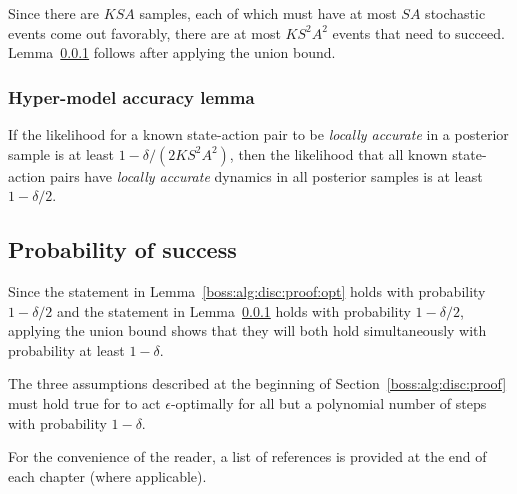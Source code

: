 Since there are $K S A$ samples, each of which must have at most $S A$ stochastic events come out favorably, there are at most $K S^2 A^2$ events that need to succeed. Lemma~\ref{boss:alg:disc:proof:acc} follows after applying the union bound.

\subsubsection{Hyper-model accuracy lemma}
\label{boss:alg:disc:proof:acc}
If the likelihood for a known state-action pair to be \emph{locally accurate} in a posterior sample is at least $1-\delta/(2 K S^2 A^2)$, then the likelihood that all known state-action pairs have \emph{locally accurate} dynamics in all posterior samples is at least $1-\delta/2$.


\subsection{Probability of success}

Since the statement in Lemma~\ref{boss:alg:disc:proof:opt} holds with probability $1-\delta/2$ and the statement in Lemma~\ref{boss:alg:disc:proof:acc} holds with probability $1-\delta/2$, applying the union bound shows that they will both hold simultaneously with probability at least $1-\delta$.

The three assumptions described at the beginning of Section~\ref{boss:alg:disc:proof} must hold true for  to act $\epsilon$-optimally for all but a polynomial number of steps with probability $1-\delta$. 



%
\ifperchapterbib%
For the convenience of the reader, a list of references is provided at the end of each chapter (where applicable).
\ifendbib%
\else\fi%
\else\fi%
